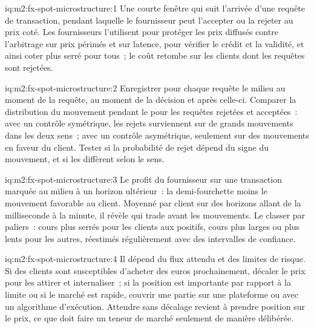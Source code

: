 \begin{solution}{iq:m2:fx-spot-microstructure:1}
Une courte fenêtre qui suit l'arrivée d'une requête de transaction, pendant laquelle le
fournisseur peut l'accepter ou la rejeter au prix coté. Les fournisseurs l'utilisent pour protéger
les prix diffusés contre l'arbitrage sur prix périmés et sur latence, pour vérifier le crédit et la
validité, et ainsi coter plus serré pour tous~; le coût retombe sur les clients dont les
requêtes sont rejetées.
\end{solution}

\begin{solution}{iq:m2:fx-spot-microstructure:2}
Enregistrer pour chaque requête le milieu au moment de la requête, au moment de la décision et après celle-ci.
Comparer la distribution du mouvement pendant le  pour les requêtes rejetées et
acceptées~: avec un contrôle symétrique, les rejets surviennent sur de grands mouvements dans les deux
sens~; avec un contrôle asymétrique, seulement sur des mouvements en faveur du client. Tester si la
probabilité de rejet dépend du signe du mouvement, et si les 
diffèrent selon le sens.
\end{solution}

\begin{solution}{iq:m2:fx-spot-microstructure:3}
Le profit du fournisseur sur une transaction marquée au milieu à un horizon ultérieur~: la
demi-fourchette moins le mouvement favorable au client. Moyenné par client sur des horizons
allant de la milliseconde à la minute, il révèle qui trade avant les mouvements. Le classer par paliers~:
cours plus serrés pour les clients aux  positifs, cours plus larges ou plus lents pour
les autres, réestimés régulièrement avec des intervalles de confiance.
\end{solution}

\begin{solution}{iq:m2:fx-spot-microstructure:4}
Il dépend du flux attendu et des limites de risque. Si des clients sont susceptibles
d'acheter des euros prochainement, décaler le prix pour les attirer et internaliser~; si la position est
importante par rapport à la limite ou si le marché est rapide, couvrir une partie sur une plateforme
ou avec un algorithme d'exécution. Attendre sans décalage revient à prendre position sur le prix,
ce que doit faire un teneur de marché seulement de manière délibérée.
\end{solution}


